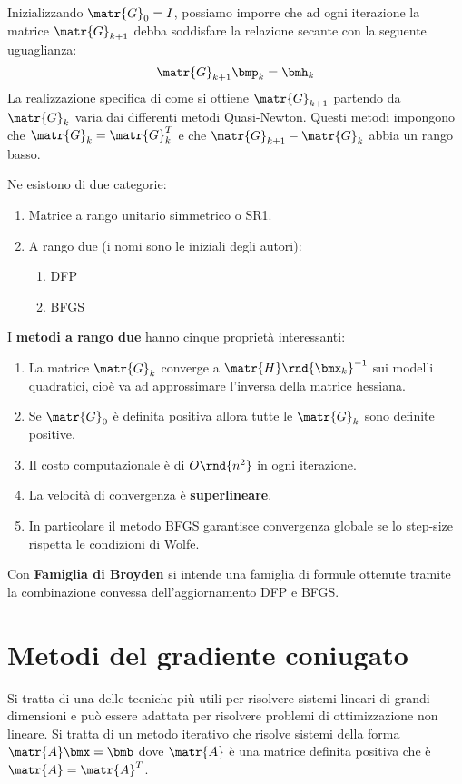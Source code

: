 \documentclass[\main/main.tex]{subfiles}
\begin{document}
Inizializzando \(\matr{G}_0 = I\), possiamo imporre che ad ogni iterazione la matrice \(\matr{G}_{k+1}\) debba soddisfare la relazione secante con la seguente uguaglianza:
\[
    \matr{G}_{k+1}\bmp_k = \bmh_k
\]
La realizzazione specifica di come si ottiene \(\matr{G}_{k+1}\) partendo da \(\matr{G}_k\) varia dai differenti metodi Quasi-Newton. Questi metodi impongono che \(\matr{G}_k = \matr{G}_k^T\) e che \(\matr{G}_{k+1} - \matr{G}_k\) abbia un rango basso.

Ne esistono di due categorie:

\begin{enumerate}
    \item Matrice a rango unitario simmetrico o SR1.
    \item A rango due (i nomi sono le iniziali degli autori):
          \begin{enumerate}
              \item DFP
              \item BFGS
          \end{enumerate}
\end{enumerate}

I \textbf{metodi a rango due} hanno cinque proprietà interessanti:

\begin{enumerate}
    \item La matrice \(\matr{G}_k\) converge a \(\matr{H}\rnd{\bmx_k}^{-1}\) sui modelli quadratici, cioè va ad approssimare l'inversa della matrice hessiana.
    \item Se \(\matr{G}_0\) è definita positiva allora tutte le \(\matr{G}_k\) sono definite positive.
    \item Il costo computazionale è di \(O\rnd{n^2}\) in ogni iterazione.
    \item La velocità di convergenza è \textbf{superlineare}.
    \item In particolare il metodo BFGS garantisce convergenza globale se lo step-size rispetta le condizioni di Wolfe.
\end{enumerate}

Con \textbf{Famiglia di Broyden} si intende una famiglia di formule ottenute tramite la combinazione convessa dell'aggiornamento DFP e BFGS.
\clearpage
\section{Metodi del gradiente coniugato}
Si tratta di una delle tecniche più utili per risolvere sistemi lineari di grandi dimensioni e può essere adattata per risolvere problemi di ottimizzazione non lineare. Si tratta di un metodo iterativo che risolve sistemi della forma \(\matr{A}\bmx = \bmb \) dove \(\matr{A}\) è una matrice definita positiva che è \(\matr{A}=\matr{A}^T\).
\end{document}
